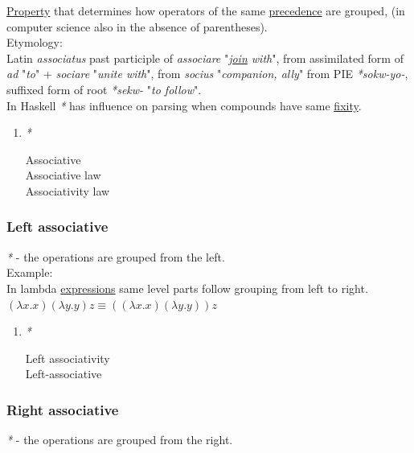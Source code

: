 \documentclass[a4paper,14pt,oneside]{book}
\begin{document}
\hyperref[org49b84ac]{Property} that determines how operators of the same \hyperref[orgbb73c40]{precedence} are grouped, (in computer science also in the absence of parentheses).\\

Etymology:\\
Latin \emph{associatus} past participle of \emph{associare} "\emph{\hyperref[orga3eb284]{join} with}", from assimilated form of \emph{ad} "\emph{to}" + \emph{sociare} "\emph{unite with}", from \emph{socius} "\emph{companion, ally}" from PIE \emph{*sokw-yo-}, suffixed form of root \emph{*sekw-} "\emph{to follow}".\\

In Haskell \emph{*} has influence on parsing when compounds have same \hyperref[org614f867]{fixity}.\\

\begin{enumerate}
\item \emph{*}
\label{sec:org5806193}

\label{orgfe56caa}Associative\\
\label{orgda8847a}Associative law\\
\label{orgc08dca0}Associativity law\\
\end{enumerate}

\subsubsection{\label{org7f88248}Left associative}
\label{sec:org448f016}
\emph{*} - the operations are grouped from the left.\\

Example:\\
In lambda \hyperref[org907bfe3]{expressions} same level parts follow grouping from left to right.\\
\((\lambda x . x)(\lambda y . y)z \equiv ((\lambda x . x)(\lambda y . y))z\)\\

\begin{enumerate}
\item \emph{*}
\label{sec:orgb77764f}

\label{org612c974}Left associativity\\
\label{org5b91a83}Left-associative\\
\end{enumerate}

\subsubsection{\label{orge256ff9}Right associative}
\label{sec:org4f399bf}
\emph{*} - the operations are grouped from the right.\\
\end{document}
